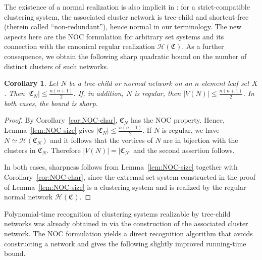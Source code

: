 \documentclass[preprint]{elsarticle}
\newtheorem{corollary}[theorem]{Corollary}
\newcommand{\CS}[1][]{\ensuremath{\mathfrak{C}_{#1}}}
\newcommand{\Hasse}{\ensuremath{\mathcal{H}}}
\begin{document}
The existence of a normal realization is also implicit in \cite{ALRR:14}: for a
strict-compatible clustering system, the associated cluster network is tree-child
\cite[Thm.~4.6]{ALRR:14} and shortcut-free \cite[Rem.~3.5]{ALRR:14} (therein called ``non-redundant''), 
hence normal in our terminology. The new aspects here are the NOC formulation for arbitrary set systems and its
connection with the canonical regular realization $\Hasse(\CS)$.
As a further consequence, we obtain the following sharp
quadratic bound on the number of distinct clusters of such networks.


\begin{corollary}
	Let $N$ be a tree-child or normal network on an $n$-element leaf set $X$. 
	Then $|\CS[N]|\leq \frac{n(n+1)}{2}$. 
	If, in addition, $N$ is regular, then $|V(N)|\leq \frac{n(n+1)}{2}$.
	In both cases, the bound is sharp.
\end{corollary}
\begin{proof}
By Corollary~\ref{cor:NOC-char}, $\CS[N]$ has the NOC property. Hence,
Lemma~\ref{lem:NOC-size} gives
$|\CS[N]|\leq \frac{n(n+1)}2$.
If $N$ is regular, we have $N\simeq \Hasse(\CS[N])$ and it follows that the 
vertices of $N$ are in bijection with the clusters in $\CS[N]$.
Therefore $|V(N)|=|\CS[N]|$ and the second assertion follows.

In both cases, sharpness follows from Lemma~\ref{lem:NOC-size} together with
Corollary~\ref{cor:NOC-char}, since the extremal set system constructed in the proof of
Lemma~\ref{lem:NOC-size} is a clustering system and is realized by the regular normal network
$\Hasse(\CS)$.
\end{proof}


Polynomial-time recognition of clustering systems realizable by tree-child networks was already
obtained in \cite{ALRR:14} via the construction of the associated cluster network. The NOC
formulation yields a direct recognition algorithm that avoids constructing a network and gives the
following slightly improved running-time bound.
\end{document}
